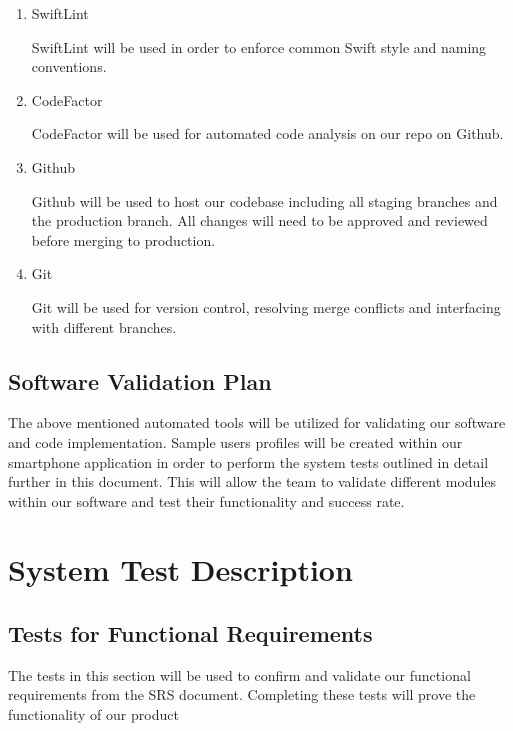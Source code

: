 \documentclass[12pt, titlepage]{article}
\begin{document}
\begin{enumerate}

\item SwiftLint

\subitem SwiftLint will be used in order to enforce common Swift style and naming conventions.

\item CodeFactor

\subitem CodeFactor will be used for automated code analysis on our repo on Github.

\item Github

\subitem Github will be used to host our codebase including all staging branches and the production branch. All changes will need to be approved and reviewed before merging to production.

\item Git

\subitem Git will be used for version control, resolving merge conflicts and interfacing with different branches.

\end{enumerate}

\subsection{Software Validation Plan}

The above mentioned automated tools will be utilized for validating our software and code implementation. Sample users profiles will be created within our smartphone application in order to perform the system tests outlined in detail further in this document. This will allow the team to validate different modules within our software and test their functionality and success rate. 

\section{System Test Description}
	
\subsection{Tests for Functional Requirements}
\label{Section 5.1}

The tests in this section will be used to confirm and validate our functional requirements from the SRS document. Completing these tests will prove the functionality of our product
\end{document}

